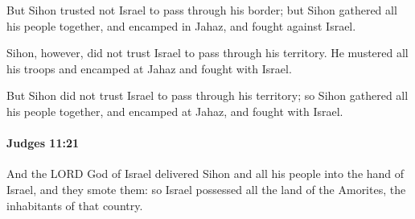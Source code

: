 			\begin{versebox}
					\item[BHS] 
					\item[ASV] But Sihon trusted not Israel to pass through his border; but Sihon gathered all his people together, and encamped in Jahaz, and fought against Israel.
					\item[NIV] Sihon, however, did not trust Israel to pass through his territory. He mustered all his troops and encamped at Jahaz and fought with Israel.
					\item[NRSV] But Sihon did not trust Israel to pass through his territory; so Sihon gathered all his people together, and encamped at Jahaz, and fought with Israel.
			\end{versebox}

		\paragraph{Judges 11:21} %
			\label{JUDGES-11-21}

			And the LORD God of Israel delivered Sihon and all his people into the hand of Israel, and they smote them: so Israel possessed all the land of the Amorites, the inhabitants of that country.

